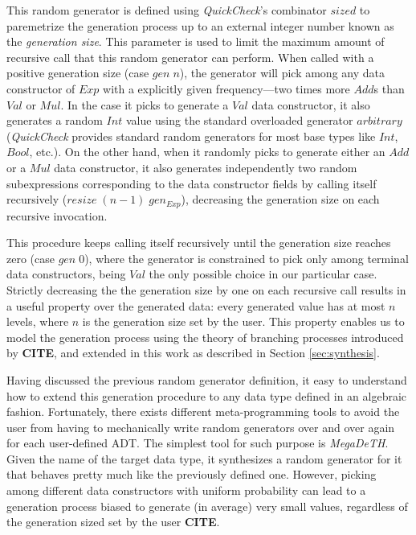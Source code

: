 \documentclass[conference, fleqn]{IEEEtran}
\newcommand{\Conid}[1]{\mathit{#1}}
\newcommand{\Varid}[1]{\mathit{#1}}
\newcommand{\tocite}{\textbf{CITE}}
\newcommand{\quickcheck}{\emph{QuickCheck}\xspace}
\newcommand{\megadeth}{\emph{MegaDeTH}\xspace}
\begin{document}
This random generator is defined using \quickcheck's combinator \ensuremath{\Varid{sized}} to
paremetrize the generation process up to an external integer number known as the
\emph{generation size}.
%
This parameter is used to limit the maximum amount of recursive call that this
random generator can perform.
%
When called with a positive generation size (case \ensuremath{\Varid{gen}\;\Varid{n}}), the generator will
pick among any data constructor of \ensuremath{\Conid{Exp}} with a explicitly given frequency---two
times more \ensuremath{\Conid{Add}}s than \ensuremath{\Conid{Val}} or \ensuremath{\Conid{Mul}}.
%
In the case it picks to generate a \ensuremath{\Conid{Val}} data constructor, it also generates a
random \ensuremath{\Conid{Int}} value using the standard overloaded generator \ensuremath{\Varid{arbitrary}}
(\quickcheck provides standard random generators for most base types like \ensuremath{\Conid{Int}},
\ensuremath{\Conid{Bool}}, etc.).
%
On the other hand, when it randomly picks to generate either an \ensuremath{\Conid{Add}} or a \ensuremath{\Conid{Mul}}
data constructor, it also generates independently two random subexpressions
corresponding to the data constructor fields by calling itself recursively
(\ensuremath{\Varid{resize}\;(n{-}1)\;gen_{Exp}}), decreasing the generation size on each recursive
invocation.


This procedure keeps calling itself recursively until the generation size
reaches zero (case \ensuremath{\Varid{gen}\;\mathrm{0}}), where the generator is constrained to pick only
among terminal data constructors, being \ensuremath{\Conid{Val}} the only possible choice in our
particular case.
%
Strictly decreasing the the generation size by one on each recursive call
results in a useful property over the generated data: every generated value has
at most \ensuremath{\Varid{n}} levels, where \ensuremath{\Varid{n}} is the generation size set by the user.
%
This property enables us to model the generation process using the theory of
branching processes introduced by \tocite, and extended in this work as
described in Section \ref{sec:synthesis}.


Having discussed the previous random generator definition, it easy to understand
how to extend this generation procedure to any data type defined in an algebraic
fashion.
%
Fortunately, there exists different meta-programming tools to avoid the user
from having to mechanically write random generators over and over again for each
user-defined ADT.
%
The simplest tool for such purpose is \megadeth.
%
Given the name of the target data type, it synthesizes a random generator for it
that behaves pretty much like the previously defined one.
%
However, picking among different data constructors with uniform probability can
lead to a generation process biased to generate (in average) very small values,
regardless of the generation sized set by the user \tocite.
\end{document}
